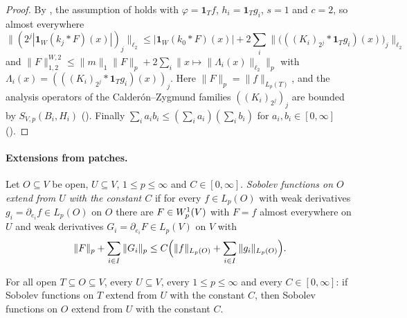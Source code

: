 \begin{proof}
\leanok
{}
By , the assumption of
 holds with $\varphi = \mathbf 1_T f$,
$h_i = \mathbf 1_T g_i$, $s = 1$ and $c = 2$, so almost everywhere
\[
  \bigl\|(2^j |\mathbf 1_W (k_j * F)(x)|)_j\bigr\|_{\ell_2} \leq |\mathbf 1_W (k_0 * F)(x)|
  + 2 \sum_i \bigl\|\bigl(((K_i)_{2^j} * \mathbf 1_T g_i)(x)\bigr)_j\bigr\|_{\ell_2}
\]
and $\|F\|^{W,2}_{1,2} \leq \|m\|_1 \|F\|_p + 2 \sum_i \|x \mapsto \|\Lambda_i(x)\|_{\ell_2}\|_p$
with $\Lambda_i(x) = (((K_i)_{2^j} * \mathbf 1_T g_i)(x))_j$. Here $\|F\|_p = \|f\|_{L_p(T)}$, and
the analysis operators of the Calder\'on--Zygmund families $((K_i)_{2^j})_j$ are bounded by
$S_{V,p}(B_i, H_i)$ (). Finally
$\sum_i a_i b_i \leq (\sum_i a_i)(\sum_i b_i)$ for $a_i, b_i \in [0, \infty]$
().
\end{proof}

\paragraph{Extensions from patches.}

\begin{definition}
\label{def:extends-sobolev}
\leanok
{}
Let $O \subseteq V$ be open, $U \subseteq V$, $1 \leq p \leq \infty$ and $C \in [0, \infty]$.
\emph{Sobolev functions on $O$ extend from $U$ with the constant $C$} if for every
$f \in L_p(O)$ with weak derivatives $g_i = \partial_{e_i} f \in L_p(O)$ on $O$ there are
$F \in W^{1}_{p}(V)$ with $F = f$ almost everywhere on $U$ and weak derivatives
$G_i = \partial_{e_i} F \in L_p(V)$ on $V$ with
\[
  \|F\|_p + \sum_{i \in I} \|G_i\|_p \leq C \Bigl(\|f\|_{L_p(O)} + \sum_{i \in I}
  \|g_i\|_{L_p(O)}\Bigr) .
\]
\end{definition}

\begin{lemma}
\label{lem:extends-sobolev-mono}
\leanok
{}
For all open $T \subseteq O \subseteq V$, every $U \subseteq V$, every $1 \leq p \leq \infty$ and
every $C \in [0, \infty]$: if Sobolev functions on $T$ extend from $U$ with the constant $C$, then
Sobolev functions on $O$ extend from $U$ with the constant $C$.
\end{lemma}

